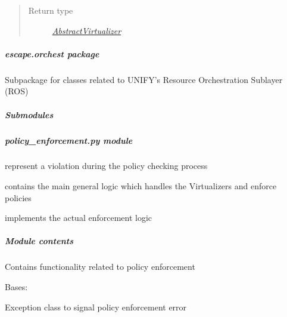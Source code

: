 \documentclass[letterpaper,10pt,english]{sphinxmanual}
\begin{document}
\begin{fulllineitems}
\begin{fulllineitems}
\begin{quote}
\begin{description}
\item[{Return type}] \leavevmode
{\hyperref[orchest/virtualization_mgmt:escape.orchest.virtualization_mgmt.AbstractVirtualizer]{\emph{AbstractVirtualizer}}}

\end{description}\end{quote}

\end{fulllineitems}


\end{fulllineitems}



\subparagraph{\emph{escape.orchest} package}
\label{orchest/orchest:module-escape.orchest}\label{orchest/orchest::doc}\label{orchest/orchest:escape-orchest-package}
Subpackage for classes related to UNIFY's Resource Orchestration Sublayer (ROS)


\subparagraph{Submodules}
\label{orchest/orchest:submodules}

\subparagraph{\emph{policy\_enforcement.py} module}
\label{orchest/policy_enforcement:policy-enforcement-py-module}\label{orchest/policy_enforcement::doc}
{\hyperref[orchest/policy_enforcement:escape.orchest.policy_enforcement.PolicyEnforcementError]{\emph{}}} represent a violation during the policy
checking process

{\hyperref[orchest/policy_enforcement:escape.orchest.policy_enforcement.PolicyEnforcementMetaClass]{\emph{}}} contains the main general logic which
handles the Virtualizers and enforce policies

{\hyperref[orchest/policy_enforcement:escape.orchest.policy_enforcement.PolicyEnforcement]{\emph{}}} implements the actual enforcement logic


\subparagraph{Module contents}
\label{orchest/policy_enforcement:module-escape.orchest.policy_enforcement}\label{orchest/policy_enforcement:module-contents}
Contains functionality related to policy enforcement

\begin{fulllineitems}
\label{orchest/policy_enforcement:escape.orchest.policy_enforcement.PolicyEnforcementError}
Bases: \href{https://docs.python.org/2.7/library/exceptions.html\#exceptions.RuntimeError}{}

Exception class to signal policy enforcement error

\end{fulllineitems}
\end{document}
